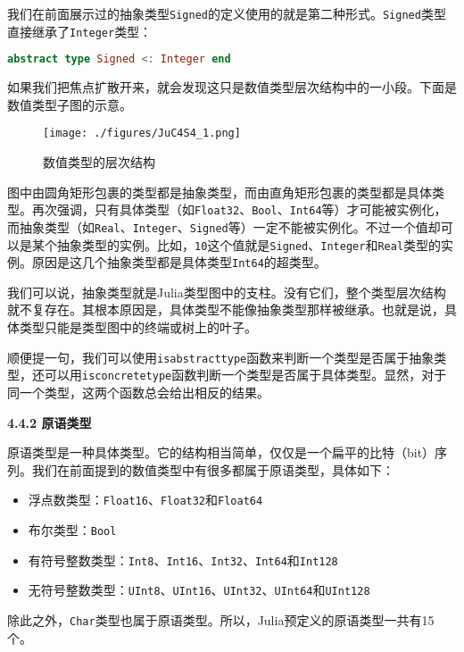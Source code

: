 我们在前面展示过的抽象类型\verb|Signed|的定义使用的就是第二种形式。\verb|Signed|类型直接继承了\verb|Integer|类型：

\begin{lstlisting}[language=julia]
abstract type Signed <: Integer end
\end{lstlisting}

如果我们把焦点扩散开来，就会发现这只是数值类型层次结构中的一小段。下面是数值类型子图的示意。

\begin{figure}[ht]
\centering
\texttt{[image: ./figures/JuC4S4\_1.png]}
\caption{数值类型的层次结构} \label{JuC4S4_fig1}
\end{figure}

图中由圆角矩形包裹的类型都是抽象类型，而由直角矩形包裹的类型都是具体类型。再次强调，只有具体类型（如\verb|Float32|、\verb|Bool|、\verb|Int64|等）才可能被实例化，而抽象类型（如\verb|Real|、\verb|Integer|、\verb|Signed|等）一定不能被实例化。不过一个值却可以是某个抽象类型的实例。比如，\verb|10|这个值就是\verb|Signed|、\verb|Integer|和\verb|Real|类型的实例。原因是这几个抽象类型都是具体类型\verb|Int64|的超类型。

我们可以说，抽象类型就是Julia类型图中的支柱。没有它们，整个类型层次结构就不复存在。其根本原因是，具体类型不能像抽象类型那样被继承。也就是说，具体类型只能是类型图中的终端或树上的叶子。

顺便提一句，我们可以使用\verb|isabstracttype|函数来判断一个类型是否属于抽象类型，还可以用\verb|isconcretetype|函数判断一个类型是否属于具体类型。显然，对于同一个类型，这两个函数总会给出相反的结果。

\textbf{4.4.2 原语类型}

原语类型是一种具体类型。它的结构相当简单，仅仅是一个扁平的比特（bit）序列。我们在前面提到的数值类型中有很多都属于原语类型，具体如下：

\begin{itemize}
\item 浮点数类型：\verb|Float16|、\verb|Float32|和\verb|Float64|
\item 布尔类型：\verb|Bool|
\item 有符号整数类型：\verb|Int8|、\verb|Int16|、\verb|Int32|、\verb|Int64|和\verb|Int128|
\item 无符号整数类型：\verb|UInt8|、\verb|UInt16|、\verb|UInt32|、\verb|UInt64|和\verb|UInt128|
\end{itemize}

除此之外，\verb|Char|类型也属于原语类型。所以，Julia预定义的原语类型一共有15个。

